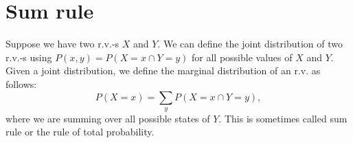 \section{Sum rule}
Suppose we have two r.v.-s $X$ and $Y$. We can define the joint distribution of two r.v.-s using $P(x,y) = P(X = x \cap Y = y)$ for all possible values of $X$ and $Y$. Given a joint distribution, we define the marginal distribution of an r.v. as follows:
\[
    P(X = x) = \sum\limits_y P(X = x \cap Y = y),
\]
where we are summing over all possible states of $Y$. This is sometimes called sum rule or the rule of total probability.
